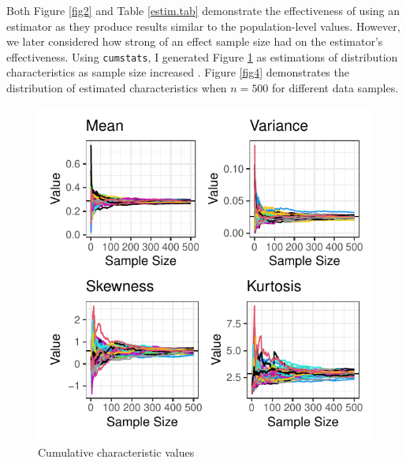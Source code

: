 \documentclass{article}\usepackage[]{graphicx}\usepackage[]{xcolor}
\begin{document}
\begin{multicols}{2}
Both Figure \ref{fig2} and Table \ref{estim.tab} demonstrate the effectiveness of using an estimator as they produce results similar to the population-level values. However, we later considered how strong of an effect sample size had on the estimator's effectiveness. Using \texttt{cumstats}, I generated Figure \ref{fig3} as estimations of distribution characteristics as sample size increased \citep{cumstats}. Figure \ref{fig4} demonstrates the distribution of estimated characteristics when $n=500$ for different data samples.

\begin{figure}[H]
 \begin{center}
 \includegraphics[scale=0.7]{sample_comparison.pdf}
 \caption{Cumulative characteristic values}
 \label{fig3}
 \end{center}
 \end{figure}


\end{multicols}
\end{document}
